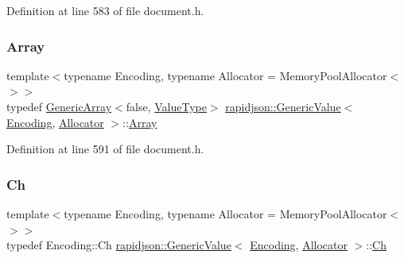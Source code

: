 Definition at line 583 of file document.\+h.

\mbox{\label{classrapidjson_1_1_generic_value_a81291ad1031afe43aca4719e2989d7dc}} 
\subsubsection{\texorpdfstring{Array}{Array}}
{\footnotesize\ttfamily template$<$typename Encoding, typename Allocator = Memory\+Pool\+Allocator$<$$>$$>$ \\
typedef \mbox{\hyperlink{classrapidjson_1_1_generic_array}{Generic\+Array}}$<$false, \mbox{\hyperlink{classrapidjson_1_1_generic_value_ad2935191ab28c2c2e472b739a9d58202}{Value\+Type}}$>$ \mbox{\hyperlink{classrapidjson_1_1_generic_value}{rapidjson\+::\+Generic\+Value}}$<$ \mbox{\hyperlink{classrapidjson_1_1_encoding}{Encoding}}, \mbox{\hyperlink{classrapidjson_1_1_allocator}{Allocator}} $>$\+::\mbox{\hyperlink{classrapidjson_1_1_generic_value_a81291ad1031afe43aca4719e2989d7dc}{Array}}}



Definition at line 591 of file document.\+h.

\mbox{\label{classrapidjson_1_1_generic_value_adcdbc7fa85a9a41b78966d7e0dcc2ac4}} 
\subsubsection{\texorpdfstring{Ch}{Ch}}
{\footnotesize\ttfamily template$<$typename Encoding, typename Allocator = Memory\+Pool\+Allocator$<$$>$$>$ \\
typedef Encoding\+::\+Ch \mbox{\hyperlink{classrapidjson_1_1_generic_value}{rapidjson\+::\+Generic\+Value}}$<$ \mbox{\hyperlink{classrapidjson_1_1_encoding}{Encoding}}, \mbox{\hyperlink{classrapidjson_1_1_allocator}{Allocator}} $>$\+::\mbox{\hyperlink{classrapidjson_1_1_generic_value_adcdbc7fa85a9a41b78966d7e0dcc2ac4}{Ch}}}



